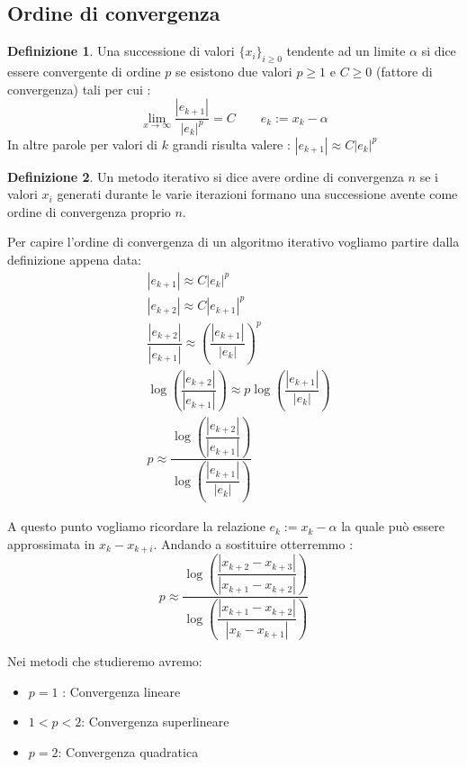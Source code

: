 \documentclass[12pt, a4paper]{book}
\theoremstyle{definition}
\newtheorem{defn}{Definizione}[section]
\begin{document}
\subsection{Ordine di convergenza}
\begin{flushleft}

\begin{defn}
	Una successione di valori $\{x_{i}\}_{i \geq 0}$ tendente ad un limite $\alpha$ si dice essere convergente di ordine $p$ se esistono due valori $p \geq 1$ e $C \geq 0$ (fattore di convergenza) tali per cui : 
	\[
		\lim_{x \to \infty} \dfrac{|e_{k+1}|}{|e_{k}|^{p}} = C \quad \quad e_{k} := x_{k} - \alpha
	\]	
	In altre parole per valori di $k$ grandi risulta valere : $|e_{k+1}| \approx C|e_{k}|^{p}$
\end{defn}

\begin{defn}
	Un metodo iterativo si dice avere ordine di convergenza $n$ se i valori $x_{i}$ generati durante le varie iterazioni formano una successione avente come ordine di convergenza proprio $n$. 
\end{defn}

Per capire l'ordine di convergenza di un algoritmo iterativo vogliamo partire dalla definizione appena data:
\begin{equation}
	\begin{split}
		& |e_{k+1}| \approx C|e_{k}|^{p} \\
		& |e_{k+2}| \approx C|e_{k+1}|^{p} \\
		& \dfrac{|e_{k+2}|}{|e_{k+1}|} \approx \left( \dfrac{|e_{k+1}|}{|e_{k}|} \right) ^ {p} \\
		& \log \left( \dfrac{|e_{k+2}|}{|e_{k+1}|} \right) \approx p \log  \left( \dfrac{|e_{k+1}|}{|e_{k}|} \right) \\
		& p \approx \dfrac{\log \left( \dfrac{|e_{k+2}|}{|e_{k+1}|} \right)}{\log  \left( \dfrac{|e_{k+1}|}{|e_{k}|} \right)}
	\end{split}
\end{equation}

A questo punto vogliamo ricordare la relazione $e_{k} := x_{k} - \alpha$ la quale può essere approssimata in $x_{k} - x_{k+i}$. Andando a sostituire otterremmo : 
\[ 
	p \approx \dfrac{\log \left( \dfrac{|x_{k+2} - x_{k+3} |}{|x_{k+1} - x_{k+2}|} \right)}{\log  \left( \dfrac{|x_{k+1} - x_{k+2}|}{|x_{k} -x_{k+1}|} \right)}
\]

Nei metodi che studieremo avremo:
\begin{itemize}
	\item $p = 1$ : Convergenza lineare
	\item $ 1 < p < 2$: Convergenza superlineare
	\item $p = 2$: Convergenza quadratica
\end{itemize}


\end{flushleft}
\end{document}
